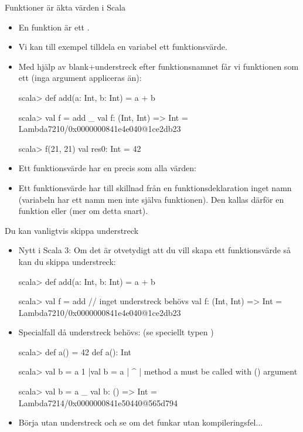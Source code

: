 
\begin{Slide}{Funktioner är äkta värden i Scala}\SlideFontSmall
\begin{itemize}
\item En funktion är ett .
\item Vi kan till exempel tilldela en variabel ett funktionsvärde.
\pause
\item Med hjälp av blank+understreck efter funktionsnamnet får vi funktionen som ett  (inga argument appliceras än):
\begin{REPLnonum}
scala> def add(a: Int, b: Int) = a + b

scala> val f = add _ 
val f: (Int, Int) => Int = Lambda7210/0x0000000841e4e040@1ce2db23

scala> f(21, 21)
val res0: Int = 42
\end{REPLnonum}
\item Ett funktionsvärde har en  precis som alla värden: \\
\pause
\item Ett funktionsvärde har till skillnad från en funktionsdeklaration inget namn (variabeln  har ett namn men inte själva funktionen). Den kallas därför en  funktion eller  (mer om detta snart).
\end{itemize}
\end{Slide}

\begin{Slide}{Du kan vanligtvis skippa understreck}\SlideFontSmall
\begin{itemize}\SlideFontSmall

\item Nytt i Scala 3: Om det är otvetydigt att du vill skapa ett funktionsvärde så kan du skippa understreck:
\begin{REPLnonum}
scala> def add(a: Int, b: Int) = a + b

scala> val f = add     // inget understreck behövs 
val f: (Int, Int) => Int = Lambda7210/0x0000000841e4e040@1ce2db23
\end{REPLnonum}

\item Specialfall då understreck behövs: (se speciellt typen )
\begin{REPLsmall}
scala> def a() = 42
def a(): Int

scala> val b = a
1 |val b = a
  |        ^
  |        method a must be called with () argument

scala> val b = a _
val b: () => Int = Lambda7214/0x0000000841e50440@565d794
\end{REPLsmall}
\item Börja utan understreck och se om det funkar utan kompileringsfel...
\end{itemize}
\end{Slide}

